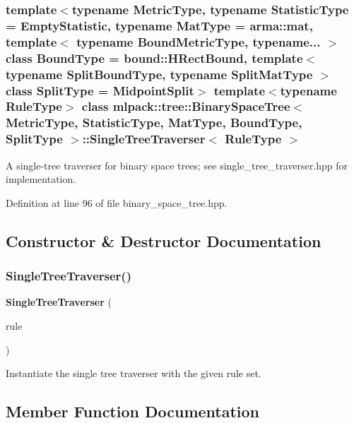 \subsubsection*{template$<$typename Metric\+Type, typename Statistic\+Type = Empty\+Statistic, typename Mat\+Type = arma\+::mat, template$<$ typename Bound\+Metric\+Type, typename... $>$ class Bound\+Type = bound\+::\+H\+Rect\+Bound, template$<$ typename Split\+Bound\+Type, typename Split\+Mat\+Type $>$ class Split\+Type = Midpoint\+Split$>$\newline
template$<$typename Rule\+Type$>$\newline
class mlpack\+::tree\+::\+Binary\+Space\+Tree$<$ Metric\+Type, Statistic\+Type, Mat\+Type, Bound\+Type, Split\+Type $>$\+::\+Single\+Tree\+Traverser$<$ Rule\+Type $>$}

A single-\/tree traverser for binary space trees; see single\+\_\+tree\+\_\+traverser.\+hpp for implementation. 



Definition at line 96 of file binary\+\_\+space\+\_\+tree.\+hpp.



\subsection{Constructor \& Destructor Documentation}
\mbox{\label{classmlpack_1_1tree_1_1BinarySpaceTree_1_1SingleTreeTraverser_aef3b0527dc7ff514b7b658b1108abae9}} 
\subsubsection{Single\+Tree\+Traverser()}
{\footnotesize\ttfamily \textbf{ Single\+Tree\+Traverser} (\begin{DoxyParamCaption}\item[{Rule\+Type \&}]{rule }\end{DoxyParamCaption})}



Instantiate the single tree traverser with the given rule set. 



\subsection{Member Function Documentation}
\mbox{\label{classmlpack_1_1tree_1_1BinarySpaceTree_1_1SingleTreeTraverser_ac2f6072011ee31a0a32f62e2a105a347}} 
